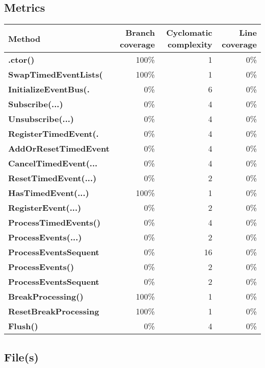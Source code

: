 \documentclass[a4paper,landscape,10pt]{article}
\begin{document}
\subsection{Metrics}
\begin{longtable}[l]{|l|r|r|r|}
\hline
\textbf{Method} & \textbf{Branch coverage} & \textbf{Cyclomatic complexity} & \textbf{Line coverage}\\
\hline
\textbf{.ctor()} & 100\% & 1 & 0\%\\
\hline
\textbf{SwapTimedEventLists(} & 100\% & 1 & 0\%\\
\hline
\textbf{InitializeEventBus(.} & 0\% & 6 & 0\%\\
\hline
\textbf{Subscribe(...)} & 0\% & 4 & 0\%\\
\hline
\textbf{Unsubscribe(...)} & 0\% & 4 & 0\%\\
\hline
\textbf{RegisterTimedEvent(.} & 0\% & 4 & 0\%\\
\hline
\textbf{AddOrResetTimedEvent} & 0\% & 4 & 0\%\\
\hline
\textbf{CancelTimedEvent(...} & 0\% & 4 & 0\%\\
\hline
\textbf{ResetTimedEvent(...)} & 0\% & 2 & 0\%\\
\hline
\textbf{HasTimedEvent(...)} & 100\% & 1 & 0\%\\
\hline
\textbf{RegisterEvent(...)} & 0\% & 2 & 0\%\\
\hline
\textbf{ProcessTimedEvents()} & 0\% & 4 & 0\%\\
\hline
\textbf{ProcessEvents(...)} & 0\% & 2 & 0\%\\
\hline
\textbf{ProcessEventsSequent} & 0\% & 16 & 0\%\\
\hline
\textbf{ProcessEvents()} & 0\% & 2 & 0\%\\
\hline
\textbf{ProcessEventsSequent} & 0\% & 2 & 0\%\\
\hline
\textbf{BreakProcessing()} & 100\% & 1 & 0\%\\
\hline
\textbf{ResetBreakProcessing} & 100\% & 1 & 0\%\\
\hline
\textbf{Flush()} & 0\% & 4 & 0\%\\
\hline
\end{longtable}
\subsection{File(s)}
\end{document}

